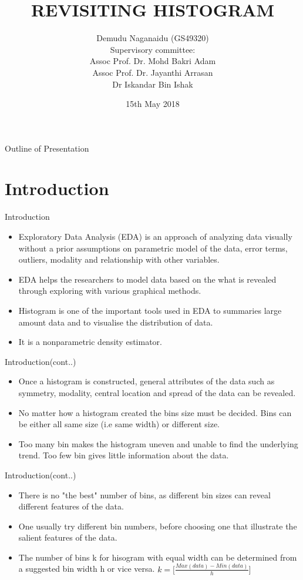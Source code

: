 \documentclass{beamer}
\title{REVISITING HISTOGRAM}
\author
{Demudu Naganaidu (GS49320) \\
Supervisory committee: \\
Assoc Prof. Dr. Mohd Bakri Adam \\
Assoc Prof. Dr. Jayanthi Arrasan\\
Dr Iskandar Bin Ishak \\}
\institute{Institute of Mathematical Research \\
University Putra Malaysia}
\date{15th May 2018}
\begin{document}
	
\begin{frame}
	\titlepage
\end{frame}

\begin{frame}{Outline of Presentation}
\tableofcontents
\end{frame}

\section{Introduction}

\begin{frame}{Introduction}
\begin{itemize}
\item Exploratory Data Analysis (EDA) is an approach of analyzing data visually without a prior assumptions on parametric model of the data, error terms, outliers, modality and relationship with other variables.
\item EDA helps the researchers to model data based on the what is revealed through exploring with various graphical methods. 
\item Histogram is one of the important tools used in EDA to summaries large amount data and to visualise the distribution of data.
\item It is a nonparametric density estimator.

\end{itemize}
\end{frame}

\begin{frame}{Introduction(cont..)}
\begin{itemize}
	\item Once a histogram is constructed, general attributes of the data such as symmetry, modality, central location and spread of the data can be revealed.
	\item No matter how a histogram created the bins size must be decided. Bins can be either all same size (i.e same width) or different size.
	\item Too many bin makes the histogram uneven and unable to find the underlying trend. Too few bin gives little information about the data.
\end{itemize}

\end{frame}



\begin{frame}{Introduction(cont..)}
	\begin{itemize}
		\item  There is no "the best" number of bins, as different bin sizes can reveal different features of the data.
		\item One usually try different bin numbers, before choosing one that illustrate the salient features of the data. \\
		\item The number of bins k  for hisogram with equal width can be determined from a suggested bin width h  or vice versa.
		$k = \Bigg[ \frac{Max(data)  - Min(data)}{h} \Bigg]$

	\end{itemize}
\end{frame}
\end{document}
